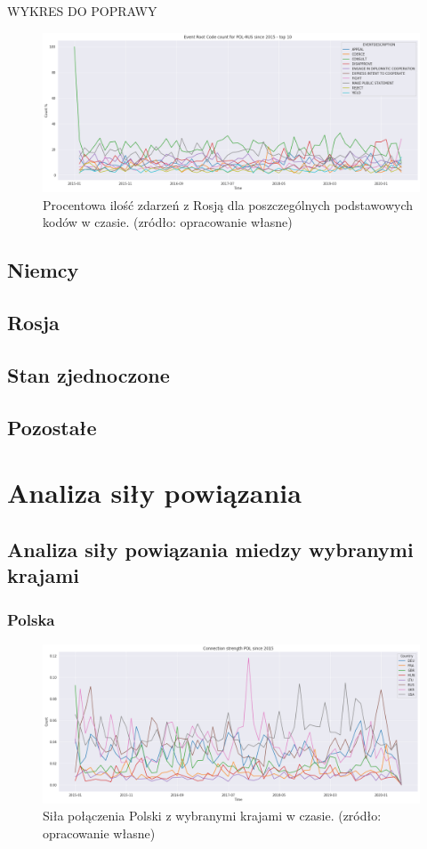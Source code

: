 \documentclass[11pt]{report}
\begin{document}
		   	   WYKRES DO POPRAWY
  	\begin{figure}[ht]
	\centering
	\includegraphics[width=0.8 \textwidth]{fig/PL/POLRUSERCperc.png}
	\caption{Procentowa ilość zdarzeń z Rosją dla poszczególnych podstawowych kodów w czasie. (zródło: opracowanie własne)}
	\label{fig:PLRUSERC}
	\end{figure}
	
	
	
 \section{Niemcy}
 \section{Rosja}
 \section{Stan zjednoczone}
 \section{Pozostałe}
 
 \chapter{Analiza siły powiązania}
 \section{Analiza siły powiązania miedzy wybranymi krajami}
 \subsection{Polska}

  	\begin{figure}[ht]
	\centering
	\includegraphics[width=0.8 \textwidth]{fig/PL/POLConnection.png}
	\caption{Siła połączenia Polski z wybranymi krajami w czasie. (zródło: opracowanie własne)}
	\label{fig:PLConnection}
	\end{figure}
	
\end{document}
